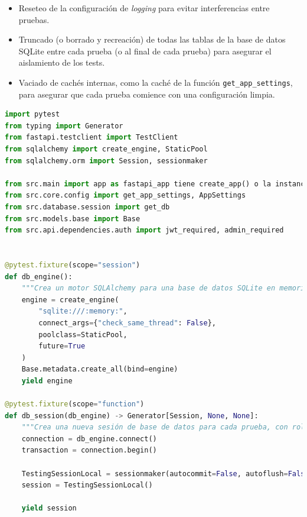 \begin{enumerate}[leftmargin=*]
        \begin{itemize}
           \item Reseteo de la configuración de \emph{logging} para evitar interferencias entre pruebas.
           \item Truncado (o borrado y recreación) de todas las tablas de la base de datos SQLite entre cada prueba (o al final de cada prueba) para asegurar el aislamiento de los tests.
           \item Vaciado de cachés internas, como la caché de la función \texttt{get\_app\_settings}, para asegurar que cada prueba comience con una configuración limpia.
        \end{itemize}
\end{enumerate}

\begin{lstlisting}[language=python,
                   caption={Extracto abreviado y conceptual de \texttt{conftest.py} para configurar el entorno de pruebas de FastAPI.},
                   label={lst:desarrollo_conftest}, % Label actualizada
                   basicstyle=\fontsize{8}{9.5}\ttfamily]
import pytest
from typing import Generator
from fastapi.testclient import TestClient
from sqlalchemy import create_engine, StaticPool
from sqlalchemy.orm import Session, sessionmaker

from src.main import app as fastapi_app tiene create_app() o la instancia app
from src.core.config import get_app_settings, AppSettings
from src.database.session import get_db
from src.models.base import Base
from src.api.dependencies.auth import jwt_required, admin_required


@pytest.fixture(scope="session")
def db_engine():
    """Crea un motor SQLAlchemy para una base de datos SQLite en memoria para las pruebas."""
    engine = create_engine(
        "sqlite:///:memory:",
        connect_args={"check_same_thread": False},
        poolclass=StaticPool,
        future=True
    )
    Base.metadata.create_all(bind=engine)
    yield engine

@pytest.fixture(scope="function")
def db_session(db_engine) -> Generator[Session, None, None]:
    """Crea una nueva sesión de base de datos para cada prueba, con rollback al final."""
    connection = db_engine.connect()
    transaction = connection.begin()
    
    TestingSessionLocal = sessionmaker(autocommit=False, autoflush=False, bind=connection, future=True)
    session = TestingSessionLocal()
    
    yield session
    

\end{lstlisting}
